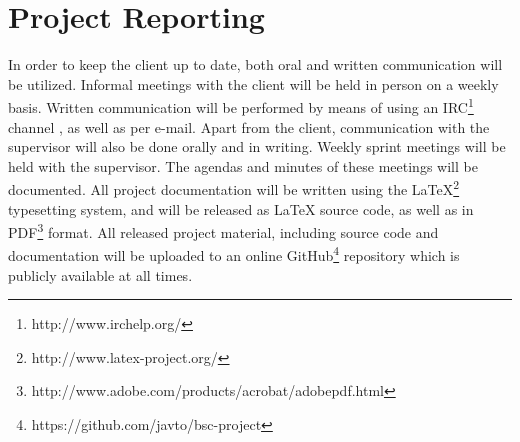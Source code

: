 \section{Project Reporting}
In order to keep the client up to date, both oral and written communication will be utilized. Informal meetings with the client will be held in person on a weekly basis. Written communication will be performed by means of using an IRC\footnote{http://www.irchelp.org/} channel , as well as per e-mail. Apart from the client, communication with the supervisor will also be done orally and in writing. Weekly sprint meetings will be held with the supervisor. The agendas and minutes of these meetings will be documented. All project documentation will be written using the LaTeX\footnote{http://www.latex-project.org/} typesetting system, and will be released as LaTeX source code, as well as in PDF\footnote{http://www.adobe.com/products/acrobat/adobepdf.html} format. All released project material, including source code and documentation will be uploaded to an online GitHub\footnote{https://github.com/javto/bsc-project} repository which is publicly available at all times.